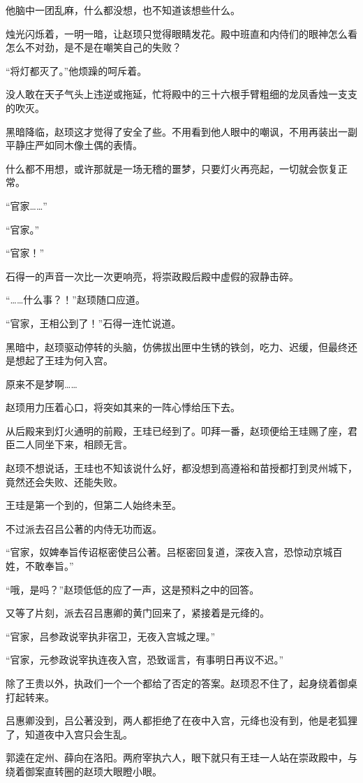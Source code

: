 他脑中一团乱麻，什么都没想，也不知道该想些什么。

烛光闪烁着，一明一暗，让赵顼只觉得眼睛发花。殿中班直和内侍们的眼神怎么看怎么不对劲，是不是在嘲笑自己的失败？

“将灯都灭了。”他烦躁的呵斥着。

没人敢在天子气头上违逆或拖延，忙将殿中的三十六根手臂粗细的龙凤香烛一支支的吹灭。

黑暗降临，赵顼这才觉得了安全了些。不用看到他人眼中的嘲讽，不用再装出一副平静庄严如同木像土偶的表情。

什么都不用想，或许那就是一场无稽的噩梦，只要灯火再亮起，一切就会恢复正常。

“官家……”

“官家。”

“官家！”

石得一的声音一次比一次更响亮，将崇政殿后殿中虚假的寂静击碎。

“……什么事？！”赵顼随口应道。

“官家，王相公到了！”石得一连忙说道。

黑暗中，赵顼驱动停转的头脑，仿佛拔出匣中生锈的铁剑，吃力、迟缓，但最终还是想起了王珪为何入宫。

原来不是梦啊……

赵顼用力压着心口，将突如其来的一阵心悸给压下去。

从后殿来到灯火通明的前殿，王珪已经到了。叩拜一番，赵顼便给王珪赐了座，君臣二人同坐下来，相顾无言。

赵顼不想说话，王珪也不知该说什么好，都没想到高遵裕和苗授都打到灵州城下，竟然还会失败、还能失败。

王珪是第一个到的，但第二人始终未至。

不过派去召吕公著的内侍无功而返。

“官家，奴婢奉旨传诏枢密使吕公著。吕枢密回复道，深夜入宫，恐惊动京城百姓，不敢奉旨。”

“哦，是吗？”赵顼低低的应了一声，这是预料之中的回答。

又等了片刻，派去召吕惠卿的黄门回来了，紧接着是元绛的。

“官家，吕参政说宰执非宿卫，无夜入宫城之理。”

“官家，元参政说宰执连夜入宫，恐致谣言，有事明日再议不迟。”

除了王贵以外，执政们一个一个都给了否定的答案。赵顼忍不住了，起身绕着御桌打起转来。

吕惠卿没到，吕公著没到，两人都拒绝了在夜中入宫，元绛也没有到，他是老狐狸了，知道夜中入宫只会生乱。

郭逵在定州、薛向在洛阳。两府宰执六人，眼下就只有王珪一人站在崇政殿中，与绕着御案直转圈的赵顼大眼瞪小眼。

